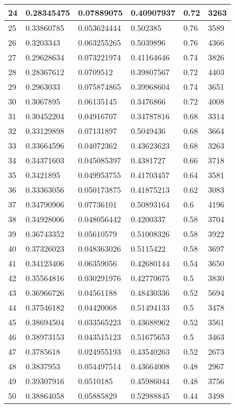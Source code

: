 \begin{longtable}{|l|l|l|l|l|l|}
24 & 0.28345475 & 0.07889075 & 0.40907937 & 0.72 & 3263 \\ \hline 
25 & 0.33860785 & 0.053624444 & 0.502385 & 0.76 & 3589 \\ \hline 
26 & 0.3203343 & 0.063255265 & 0.5039896 & 0.76 & 4366 \\ \hline 
27 & 0.29628634 & 0.073221974 & 0.41164646 & 0.74 & 3826 \\ \hline 
28 & 0.28367612 & 0.0709512 & 0.39807567 & 0.72 & 4403 \\ \hline 
29 & 0.2963033 & 0.075874865 & 0.39968604 & 0.74 & 3651 \\ \hline 
30 & 0.3067895 & 0.06135145 & 0.3476866 & 0.72 & 4008 \\ \hline 
31 & 0.30452204 & 0.04916707 & 0.34787816 & 0.68 & 3314 \\ \hline 
32 & 0.33129898 & 0.07131897 & 0.5049436 & 0.68 & 3664 \\ \hline 
33 & 0.33664596 & 0.04072362 & 0.43623623 & 0.68 & 3263 \\ \hline 
34 & 0.34371603 & 0.045085397 & 0.4381727 & 0.66 & 3718 \\ \hline 
35 & 0.3421895 & 0.049953755 & 0.41703457 & 0.64 & 3581 \\ \hline 
36 & 0.33363056 & 0.050173875 & 0.41875213 & 0.62 & 3083 \\ \hline 
37 & 0.34790906 & 0.07736101 & 0.50893164 & 0.6 & 4196 \\ \hline 
38 & 0.34928006 & 0.048056442 & 0.4200337 & 0.58 & 3704 \\ \hline 
39 & 0.36743352 & 0.05610579 & 0.51008326 & 0.58 & 3922 \\ \hline 
40 & 0.37326023 & 0.048363026 & 0.5115422 & 0.58 & 3697 \\ \hline 
41 & 0.34123406 & 0.06359056 & 0.42680144 & 0.54 & 3650 \\ \hline 
42 & 0.35564816 & 0.030291976 & 0.42770675 & 0.5 & 3830 \\ \hline 
43 & 0.36966726 & 0.04561188 & 0.48430336 & 0.52 & 5694 \\ \hline 
44 & 0.37546182 & 0.04420068 & 0.51494133 & 0.5 & 3478 \\ \hline 
45 & 0.38694504 & 0.033565223 & 0.43688962 & 0.52 & 3561 \\ \hline 
46 & 0.38973153 & 0.043515123 & 0.51675653 & 0.5 & 3463 \\ \hline 
47 & 0.3785618 & 0.024955193 & 0.43540263 & 0.52 & 2673 \\ \hline 
48 & 0.3837953 & 0.054497514 & 0.43664008 & 0.48 & 2967 \\ \hline 
49 & 0.39307916 & 0.0510185 & 0.45986044 & 0.48 & 3756 \\ \hline 
50 & 0.38864058 & 0.05885829 & 0.52988845 & 0.44 & 3498 \\ \hline 
\end{longtable}